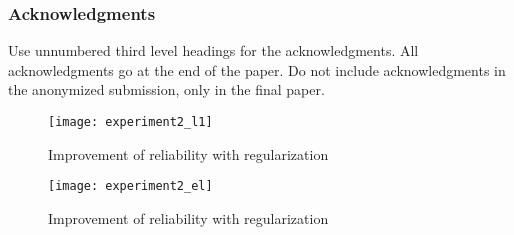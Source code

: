 \documentclass{article} %
\begin{document}
\subsubsection*{Acknowledgments}

Use unnumbered third level headings for the acknowledgments. All
acknowledgments go at the end of the paper. Do not include 
acknowledgments in the anonymized submission, only in the 
final paper.












\newpage






\begin{figure}
\texttt{[image: experiment2\_l1]}
\caption{\small Improvement of reliability with regularization}
\end{figure}


\begin{figure}
\texttt{[image: experiment2\_el]}
\caption{\small Improvement of reliability with regularization}
\end{figure}
\end{document}
